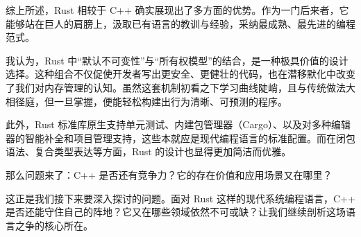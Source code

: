 综上所述，Rust 相较于 C++ 确实展现出了多方面的优势。作为一门后来者，它能够站在巨人的肩膀上，汲取已有语言的教训与经验，采纳最成熟、最先进的编程范式。

我认为，Rust 中“默认不可变性”与“所有权模型”的结合，是一种极具价值的设计选择。这种组合不仅促使开发者写出更安全、更健壮的代码，也在潜移默化中改变了我们对内存管理的认知。虽然这套机制初看之下学习曲线陡峭，且与传统做法大相径庭，但一旦掌握，便能轻松构建出行为清晰、可预测的程序。

此外，Rust 标准库原生支持单元测试、内建包管理器（Cargo）、以及对多种编辑器的智能补全和项目管理支持，这些本就应是现代编程语言的标准配置。而在闭包语法、复合类型表达等方面，Rust 的设计也显得更加简洁而优雅。

那么问题来了：C++ 是否还有竞争力？它的存在价值和应用场景又在哪里？

这正是我们接下来要深入探讨的问题。面对 Rust 这样的现代系统编程语言，C++ 是否还能守住自己的阵地？它又在哪些领域依然不可或缺？让我们继续剖析这场语言之争的核心所在。